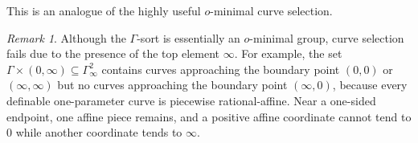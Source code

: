 \documentclass[12pt]{amsart}
\theoremstyle{plain}
\theoremstyle{definition}
\theoremstyle{remark}
\newtheorem{rem}[thm]{Remark}
\numberwithin{equation}{section}
\theoremstyle{plain}
\newcommand{\MM}{\mdl M}
\newcommand{\omin}{$o$\nobreakdash}
\newcommand{\0}{\emptyset}
\newcommand{\mdl}[1]{\mathcal{#1}}  %
\newcommand{\fun}{\longrightarrow}
\newcommand{\sub}{\subseteq}
\newcommand{\mi}{\smallsetminus}
\DeclareMathOperator{\vv}{val}
\begin{document}
This is an analogue of the highly useful \omin-minimal curve selection.

\begin{rem}
Although the $\Gamma$-sort is essentially an \omin-minimal group, curve selection fails due to the presence of the top element $\infty$. For example, the set $\Gamma \times (0, \infty) \sub  \Gamma^2_\infty$ contains curves approaching the boundary point $(0, 0)$ or $(\infty, \infty)$ but no curves approaching the boundary point $(\infty, 0)$, because every definable one-parameter curve is piecewise rational-affine. Near a one-sided endpoint, one affine piece remains, and a positive affine coordinate cannot tend to $0$ while another coordinate tends to $\infty$.
\end{rem}


\end{document}
